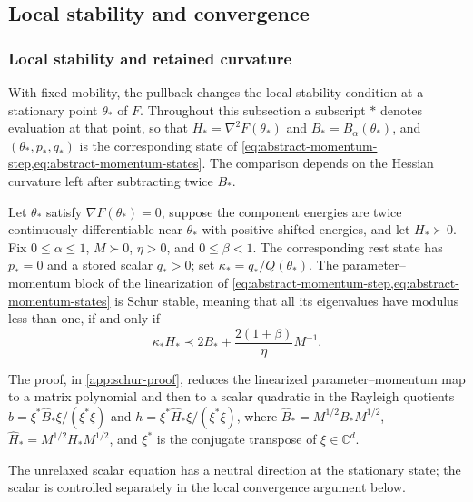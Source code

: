 \subsection{Local stability and convergence}
\label{sec:local-stability-convergence}

\subsubsection{Local stability and retained curvature}
\label{sec:local-stability}

With fixed mobility, the pullback changes the local stability condition at a
stationary point \(\theta_*\) of \(F\). Throughout this subsection a
subscript \(*\) denotes evaluation at that point, so that
\(H_*=\nabla^2F(\theta_*)\) and \(B_*=B_\alpha(\theta_*)\), and
\((\theta_*,p_*,q_*)\) is the corresponding state of
\cref{eq:abstract-momentum-step,eq:abstract-momentum-states}. The comparison
depends on the Hessian curvature left after subtracting twice \(B_*\).

\begin{theorem}
\label{thm:local-schur-stability}
Let \(\theta_*\) satisfy \(\nabla F(\theta_*)=0\), suppose the component
energies are twice continuously differentiable near \(\theta_*\) with
positive shifted energies, and let \(H_*\succ0\). Fix
\(0\leq\alpha\leq1\), \(M\succ0\), \(\eta>0\), and
\(0\leq\beta<1\). The corresponding rest state has \(p_*=0\) and a stored
scalar \(q_*>0\); set \(\kappa_*=q_*/Q(\theta_*)\). The parameter--momentum block of the
linearization of \cref{eq:abstract-momentum-step,eq:abstract-momentum-states}
is Schur stable, meaning that all its eigenvalues have modulus less than one,
if and only if
\begin{equation}
  \kappa_*H_*
  \prec 2B_*+\frac{2(1+\beta)}{\eta}M^{-1}.
  \label{eq:local-stability-criterion}
\end{equation}
\end{theorem}

The proof, in \cref{app:schur-proof}, reduces the linearized
parameter--momentum map to a matrix polynomial and then to a scalar quadratic
in the Rayleigh quotients \(b=\xi^*\widehat B_*\xi/(\xi^*\xi)\) and
\(h=\xi^*\widehat H_*\xi/(\xi^*\xi)\), where
\(\widehat B_*=M^{1/2}B_*M^{1/2}\), \(\widehat H_*=M^{1/2}H_*M^{1/2}\),
and \(\xi^*\) is the conjugate transpose of \(\xi\in\mathbb C^d\).

The unrelaxed scalar equation has a neutral direction at the stationary state;
the scalar is controlled separately in the local convergence argument below.

